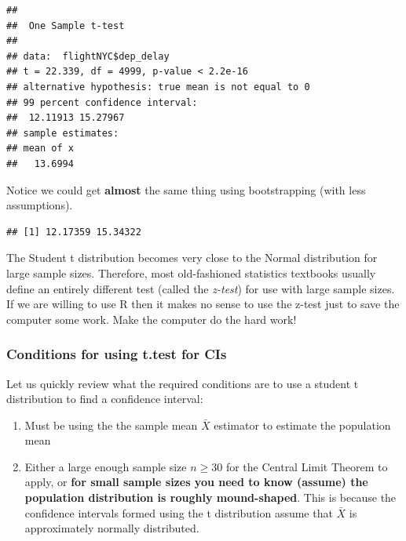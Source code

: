 \documentclass[
]{book}
\newenvironment{Shaded}{\begin{snugshade}}{\end{snugshade}}
\newcommand{\AttributeTok}[1]{\textcolor[rgb]{0.77,0.63,0.00}{#1}}
\newcommand{\FloatTok}[1]{\textcolor[rgb]{0.00,0.00,0.81}{#1}}
\newcommand{\FunctionTok}[1]{\textcolor[rgb]{0.00,0.00,0.00}{#1}}
\newcommand{\NormalTok}[1]{#1}
\newcommand{\SpecialCharTok}[1]{\textcolor[rgb]{0.00,0.00,0.00}{#1}}
\theoremstyle{definition}
\theoremstyle{definition}
\theoremstyle{definition}
\theoremstyle{definition}
\theoremstyle{remark}
\begin{document}
\begin{Shaded}
\end{Shaded}

\begin{verbatim}
## 
##  One Sample t-test
## 
## data:  flightNYC$dep_delay
## t = 22.339, df = 4999, p-value < 2.2e-16
## alternative hypothesis: true mean is not equal to 0
## 99 percent confidence interval:
##  12.11913 15.27967
## sample estimates:
## mean of x 
##   13.6994
\end{verbatim}

Notice we could get \textbf{almost} the same thing using bootstrapping (with less assumptions).

\begin{Shaded}
\end{Shaded}

\begin{verbatim}
## [1] 12.17359 15.34322
\end{verbatim}

The Student t distribution becomes very close to the Normal distribution for large sample sizes. Therefore, most old-fashioned statistics textbooks usually define an entirely different test (called the \emph{z-test}) for use with large sample sizes. If we are willing to use R then it makes no sense to use the z-test just to save the computer some work. Make the computer do the hard work!

\hypertarget{conditions-for-using-t.test-for-cis}{%
\subsubsection{Conditions for using t.test for CIs}\label{conditions-for-using-t.test-for-cis}}

Let us quickly review what the required conditions are to use a student t distribution to find a confidence interval:

\begin{enumerate}
\def\labelenumi{\arabic{enumi}.}
\item
  Must be using the the sample mean \(\bar{X}\) estimator to estimate the population mean
\item
  Either a large enough sample size \(n \geq 30\) for the Central Limit Theorem to apply, or \textbf{for small sample sizes you need to know (assume) the population distribution is roughly mound-shaped}. This is because the confidence intervals formed using the t distribution assume that \(\bar{X}\) is approximately normally distributed.
\end{enumerate}
\end{document}
